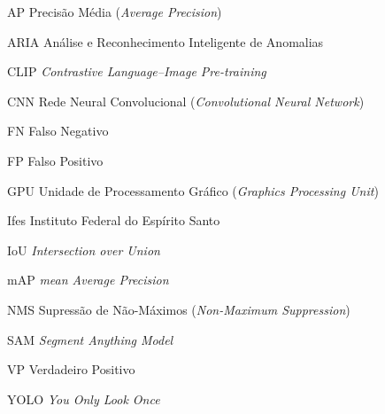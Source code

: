 \begin{siglas}
    \item[AP] Precisão Média (\textit{Average Precision})
    \item[ARIA] Análise e Reconhecimento Inteligente de Anomalias
    \item[CLIP] \textit{Contrastive Language--Image Pre-training}
    \item[CNN] Rede Neural Convolucional (\textit{Convolutional Neural Network})
    \item[FN] Falso Negativo
    \item[FP] Falso Positivo
    \item[GPU] Unidade de Processamento Gráfico (\textit{Graphics Processing Unit})
    \item[Ifes] Instituto Federal do Espírito Santo
    \item[IoU] \textit{Intersection over Union}
    \item[mAP] \textit{mean Average Precision}
    \item[NMS] Supressão de Não-Máximos (\textit{Non-Maximum Suppression})
    \item[SAM] \textit{Segment Anything Model}
    \item[VP] Verdadeiro Positivo
    \item[YOLO] \textit{You Only Look Once}
\end{siglas}

